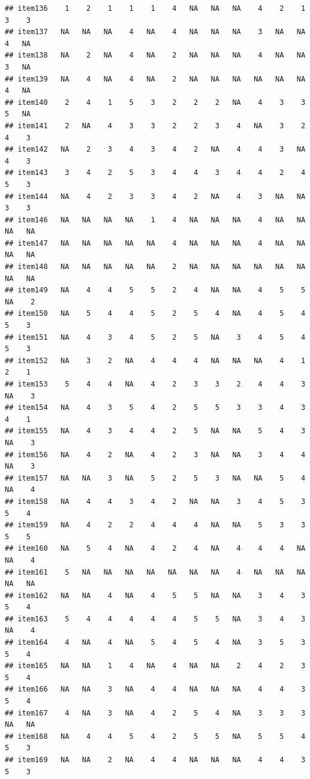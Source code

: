 \documentclass[
  man]{apa6}
\begin{document}
\begin{verbatim}
## item136    1    2    1    1    1    4   NA   NA   NA    4    2    1    3    3
## item137   NA   NA   NA    4   NA    4   NA   NA   NA    3   NA   NA    4   NA
## item138   NA    2   NA    4   NA    2   NA   NA   NA    4   NA   NA    3   NA
## item139   NA    4   NA    4   NA    2   NA   NA   NA   NA   NA   NA    4   NA
## item140    2    4    1    5    3    2    2    2   NA    4    3    3    5   NA
## item141    2   NA    4    3    3    2    2    3    4   NA    3    2    4    3
## item142   NA    2    3    4    3    4    2   NA    4    4    3   NA    4    3
## item143    3    4    2    5    3    4    4    3    4    4    2    4    5    3
## item144   NA    4    2    3    3    4    2   NA    4    3   NA   NA    3    3
## item146   NA   NA   NA   NA    1    4   NA   NA   NA    4   NA   NA   NA   NA
## item147   NA   NA   NA   NA   NA    4   NA   NA   NA    4   NA   NA   NA   NA
## item148   NA   NA   NA   NA   NA    2   NA   NA   NA   NA   NA   NA   NA   NA
## item149   NA    4    4    5    5    2    4   NA   NA    4    5    5   NA    2
## item150   NA    5    4    4    5    2    5    4   NA    4    5    4    5    3
## item151   NA    4    3    4    5    2    5   NA    3    4    5    4    5    3
## item152   NA    3    2   NA    4    4    4   NA   NA   NA    4    1    2    1
## item153    5    4    4   NA    4    2    3    3    2    4    4    3   NA    3
## item154   NA    4    3    5    4    2    5    5    3    3    4    3    4    1
## item155   NA    4    3    4    4    2    5   NA   NA    5    4    3   NA    3
## item156   NA    4    2   NA    4    2    3   NA   NA    3    4    4   NA    3
## item157   NA   NA    3   NA    5    2    5    3   NA   NA    5    4   NA    4
## item158   NA    4    4    3    4    2   NA   NA    3    4    5    3    5    4
## item159   NA    4    2    2    4    4    4   NA   NA    5    3    3    5    5
## item160   NA    5    4   NA    4    2    4   NA    4    4    4   NA   NA    4
## item161    5   NA   NA   NA   NA   NA   NA   NA    4   NA   NA   NA   NA   NA
## item162   NA   NA    4   NA    4    5    5   NA   NA    3    4    3    5    4
## item163    5    4    4    4    4    4    5    5   NA    3    4    3   NA    4
## item164    4   NA    4   NA    5    4    5    4   NA    3    5    3    5    4
## item165   NA   NA    1    4   NA    4   NA   NA    2    4    2    3    5    4
## item166   NA   NA    3   NA    4    4   NA   NA   NA    4    4    3    5    4
## item167    4   NA    3   NA    4    2    5    4   NA    3    3    3   NA   NA
## item168   NA    4    4    5    4    2    5    5   NA    5    5    4    5    3
## item169   NA   NA    2   NA    4    4   NA   NA   NA    4    4    3    5    3

\end{verbatim}
\end{document}
